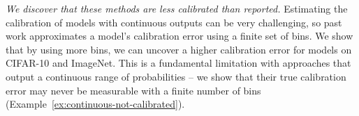


\emph{We discover that these methods are less calibrated than reported.} Estimating the calibration of models with continuous outputs can be very challenging, so past work approximates a model's calibration error using a finite set of bins. We show that by using more bins, we can uncover a higher calibration error for models on CIFAR-10 and ImageNet. This is a fundamental limitation with approaches that output a continuous range of probabilities -- we show that their true calibration error may never be measurable with a finite number of bins (Example~\ref{ex:continuous-not-calibrated}).

